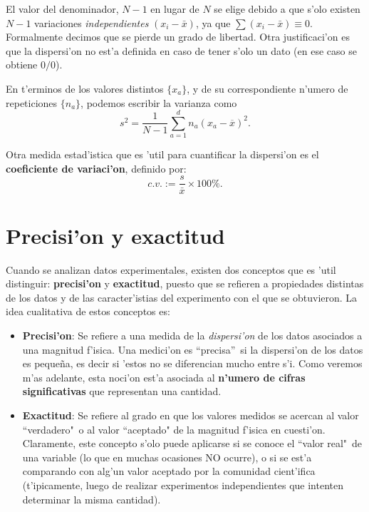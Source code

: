 \documentclass[a4paper]{report}
\begin{document}
 El valor del denominador, $N-1$ en lugar de $N$ se elige debido a que s'olo existen $N-1$ variaciones \textit{independientes} $(x_i-\bar{x})$, ya que $\sum (x_i-\bar{x})\equiv 0$. Formalmente decimos que se pierde un grado de libertad. Otra justificaci'on es que la dispersi'on no est'a definida en caso de tener s'olo un dato (en ese caso se obtiene $0/0$).

En t'erminos de los valores distintos $\lbrace x_a\rbrace$, y de su correspondiente n'umero de repeticiones $\lbrace n_a\rbrace$, podemos escribir la varianza como
\begin{equation}
s^2=\frac{1}{N-1}\sum_{a=1}^{d}n_a(x_a-\overline{x})^2.
\end{equation}

Otra medida estad'istica que es 'util para cuantificar la dispersi'on es el \textbf{coeficiente de variaci'on}, definido por:
\begin{equation}
c.v.:=\frac{s}{\bar{x}}\times 100\%.
\end{equation}
%


\section{Precisi'on y exactitud}
Cuando se analizan datos experimentales, existen dos conceptos que es 'util distinguir: \textbf{precisi'on} y \textbf{exactitud}, puesto que se refieren a propiedades distintas de los datos y de las caracter'istias del experimento con el que se obtuvieron. La idea cualitativa de estos conceptos es:
\begin{itemize}
\item \textbf{Precisi'on}: Se refiere a una medida de la \textit{dispersi'on} de los datos asociados a una magnitud f'isica. Una medici'on es ``precisa''\, si la dispersi'on de los datos es peque\~na, es decir si 'estos no se diferencian mucho entre s'i. Como veremos m'as adelante, esta noci'on est'a asociada al \textbf{n'umero de cifras significativas} que representan una cantidad.
\item \textbf{Exactitud}: Se refiere al grado en que los valores medidos se acercan al valor ``verdadero"\, o al valor ``aceptado" de la magnitud f'isica en cuesti'on. Claramente, este concepto s'olo puede aplicarse si se conoce el ``valor real"\, de una variable (lo que en muchas ocasiones NO ocurre), o si se est'a comparando con alg'un valor aceptado por la comunidad cient'ifica (t'ipicamente, luego de realizar experimentos independientes que intenten determinar la misma cantidad).
\end{itemize}
\end{document}
